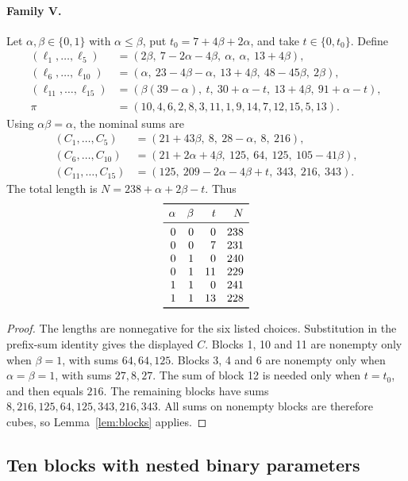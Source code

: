 \paragraph{Family V.}
Let $\alpha,\beta\in\{0,1\}$ with $\alpha\le\beta$, put
$t_0=7+4\beta+2\alpha$, and take $t\in\{0,t_0\}$. Define
\[
\begin{aligned}
(\ell_1,\ldots,\ell_5)
 &= (2\beta,\ 7-2\alpha-4\beta,\ \alpha,\ \alpha,\ 13+4\beta),\\
(\ell_6,\ldots,\ell_{10})
 &= (\alpha,\ 23-4\beta-\alpha,\ 13+4\beta,\ 48-45\beta,\ 2\beta),\\
(\ell_{11},\ldots,\ell_{15})
 &= (\beta(39-\alpha),\ t,\ 30+\alpha-t,\ 13+4\beta,\ 91+\alpha-t),\\
\pi&=(10,4,6,2,8,3,11,1,9,14,7,12,15,5,13).
\end{aligned}
\]
Using $\alpha\beta=\alpha$, the nominal sums are
\[
\begin{aligned}
(C_1,\ldots,C_5)&=(21+43\beta,\ 8,\ 28-\alpha,\ 8,\ 216),\\
(C_6,\ldots,C_{10})&=(21+2\alpha+4\beta,\ 125,\ 64,\ 125,\ 105-41\beta),\\
(C_{11},\ldots,C_{15})&=(125,\ 209-2\alpha-4\beta+t,\ 343,\ 216,\ 343).
\end{aligned}
\]
The total length is $N=238+\alpha+2\beta-t$. Thus
\[
\begin{array}{rrrr}\toprule
\alpha&\beta&t&N\\\midrule
0&0&0&238\\0&0&7&231\\
0&1&0&240\\0&1&11&229\\
1&1&0&241\\1&1&13&228\\\bottomrule
\end{array}
\]
\begin{proof}
The lengths are nonnegative for the six listed choices.
Substitution in the prefix-sum identity gives the displayed $C$.
Blocks 1, 10 and 11 are nonempty only when $\beta=1$, with sums
$64,64,125$. Blocks 3, 4 and 6 are nonempty only when
$\alpha=\beta=1$, with sums $27,8,27$.
The sum of block 12 is needed only when $t=t_0$, and then equals $216$.
The remaining blocks have sums $8,216,125,64,125,343,216,343$.
All sums on nonempty blocks are therefore cubes, so
Lemma~\ref{lem:blocks} applies.
\end{proof}

\subsection{Ten blocks with nested binary parameters}
